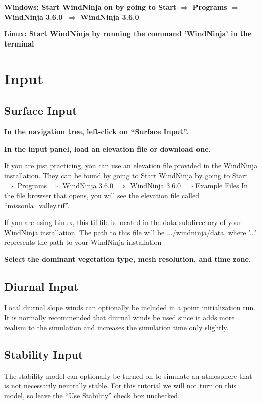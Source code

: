 \documentclass[12pt]{article}
\newcommand\vn{3.6.0}
\begin{document}
\textbf{\color{red}Windows: Start WindNinja on  by going to Start $\Rightarrow$ Programs $\Rightarrow$ WindNinja \vn\ $\Rightarrow$ WindNinja \vn\  }

\textbf{\color{red}Linux: Start WindNinja by running the command 'WindNinja' in the terminal }


\section{Input}
\subsection{Surface Input}

\textbf{\color{red}In the navigation tree, left-click on “Surface Input”.}

\textbf{\color{red}
In the input panel, load an elevation file or download one.}

If you are just practicing, you can use an elevation file provided in the WindNinja installation.  They can be found by going to Start WindNinja by going to Start $\Rightarrow$ Programs $\Rightarrow$ WindNinja \vn\ $\Rightarrow$ WindNinja \vn\ $\Rightarrow$Example Files  In the file browser that opens, you will see the elevation file called “missoula\_valley.tif”.

If you are using Linux, this tif file is located in the data subdirectory of your WindNinja installation. The path to this file will be .../windninja/data, where '...' represents the path to your WindNinja installation

\textbf{\color{red}Select the dominant vegetation type, mesh resolution, and time zone.}

\subsection{Diurnal Input}
Local diurnal slope winds can optionally be included in a point initialization run.  It is normally recommended that diurnal winds be used since it adds more realism to the simulation and increases the simulation time only slightly.

\subsection{Stability Input}

The stability model can optionally be turned on to simulate an atmosphere that is not necessarily neutrally stable.  For this tutorial we will not turn on this model, so leave the “Use Stability” check box unchecked.
\end{document}
